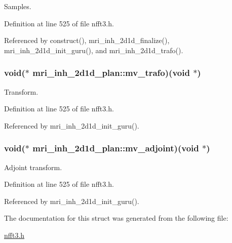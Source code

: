 Samples. 



Definition at line 525 of file nfft3.\-h.



Referenced by construct(), mri\-\_\-inh\-\_\-2d1d\-\_\-finalize(), mri\-\_\-inh\-\_\-2d1d\-\_\-init\-\_\-guru(), and mri\-\_\-inh\-\_\-2d1d\-\_\-trafo().

\hypertarget{structmri__inh__2d1d__plan_a4cad33b38f4d5bc54b8d25d90913ab44}{
\subsubsection[{mv\-\_\-trafo}]{\setlength{\rightskip}{0pt plus 5cm}void($\ast$ mri\-\_\-inh\-\_\-2d1d\-\_\-plan\-::mv\-\_\-trafo)(void $\ast$)}}\label{structmri__inh__2d1d__plan_a4cad33b38f4d5bc54b8d25d90913ab44}


Transform. 



Definition at line 525 of file nfft3.\-h.



Referenced by mri\-\_\-inh\-\_\-2d1d\-\_\-init\-\_\-guru().

\hypertarget{structmri__inh__2d1d__plan_afe427225384a2d226c3cb85cf9aa4042}{
\subsubsection[{mv\-\_\-adjoint}]{\setlength{\rightskip}{0pt plus 5cm}void($\ast$ mri\-\_\-inh\-\_\-2d1d\-\_\-plan\-::mv\-\_\-adjoint)(void $\ast$)}}\label{structmri__inh__2d1d__plan_afe427225384a2d226c3cb85cf9aa4042}


Adjoint transform. 



Definition at line 525 of file nfft3.\-h.



Referenced by mri\-\_\-inh\-\_\-2d1d\-\_\-init\-\_\-guru().



The documentation for this struct was generated from the following file\-:\begin{DoxyCompactItemize}
\item 
\hyperlink{nfft3_8h}{nfft3.\-h}\end{DoxyCompactItemize}
